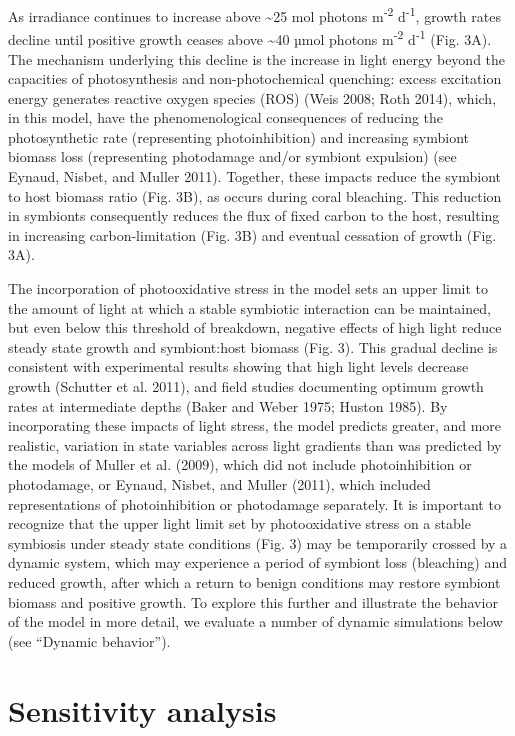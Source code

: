 \documentclass[]{elsarticle} %
\begin{document}
As irradiance continues to increase above \textasciitilde{}25 mol
photons m\textsuperscript{-2} d\textsuperscript{-1}, growth rates
decline until positive growth ceases above \textasciitilde{}40 µmol
photons m\textsuperscript{-2} d\textsuperscript{-1} (Fig. 3A). The
mechanism underlying this decline is the increase in light energy beyond
the capacities of photosynthesis and non-photochemical quenching: excess
excitation energy generates reactive oxygen species (ROS) (Weis 2008;
Roth 2014), which, in this model, have the phenomenological consequences
of reducing the photosynthetic rate (representing photoinhibition) and
increasing symbiont biomass loss (representing photodamage and/or
symbiont expulsion) (see Eynaud, Nisbet, and Muller 2011). Together,
these impacts reduce the symbiont to host biomass ratio (Fig. 3B), as
occurs during coral bleaching. This reduction in symbionts consequently
reduces the flux of fixed carbon to the host, resulting in increasing
carbon-limitation (Fig. 3B) and eventual cessation of growth (Fig. 3A).

The incorporation of photooxidative stress in the model sets an upper
limit to the amount of light at which a stable symbiotic interaction can
be maintained, but even below this threshold of breakdown, negative
effects of high light reduce steady state growth and symbiont:host
biomass (Fig. 3). This gradual decline is consistent with experimental
results showing that high light levels decrease growth (Schutter et al.
2011), and field studies documenting optimum growth rates at
intermediate depths (Baker and Weber 1975; Huston 1985). By
incorporating these impacts of light stress, the model predicts greater,
and more realistic, variation in state variables across light gradients
than was predicted by the models of Muller et al. (2009), which did not
include photoinhibition or photodamage, or Eynaud, Nisbet, and Muller
(2011), which included representations of photoinhibition or photodamage
separately. It is important to recognize that the upper light limit set
by photooxidative stress on a stable symbiosis under steady state
conditions (Fig. 3) may be temporarily crossed by a dynamic system,
which may experience a period of symbiont loss (bleaching) and reduced
growth, after which a return to benign conditions may restore symbiont
biomass and positive growth. To explore this further and illustrate the
behavior of the model in more detail, we evaluate a number of dynamic
simulations below (see ``Dynamic behavior'').

\section{Sensitivity analysis}\label{sensitivity-analysis}
\end{document}
